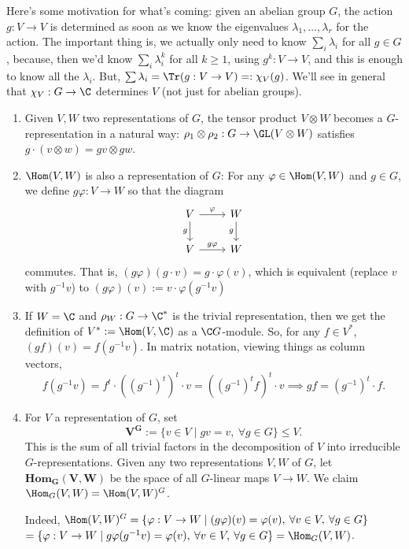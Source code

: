 Here's some motivation for what's coming: given an abelian group $G$, the action $g:V \to V$ is determined as soon as we know the eigenvalues $\lambda_1,\dots,\lambda_r$ for the action. The important thing is, we actually only need to know $\sum_{i}\lambda_i$ for all $g \in G$, because, then we'd know $\sum_{i}\lambda_i^k$ for all $k \geq 1$, using $g^k:V \to V$, and this is enough to know all the $\lambda_i$. But, $\sum \lambda_i = \Tr (g:V \to V)=: \chi_V(g)$. We'll see in general that $\chi _V:G \to \C$ determines $V$ (not just for abelian groups).

\begin{ex}
    \hfill
    \begin{enumerate}
        \item Given $V,W$ two representations of $G$, the tensor product $V \otimes W$ becomes a $G$-representation in a natural way: $\rho_1 \otimes \rho_2:G \to \GL(V\otimes W)$ satisfies $g \cdot (v \otimes w)=gv\otimes gw$.
        \item $\Hom(V,W)$ is also a representation of $G$: For any $\varphi \in \Hom(V,W)$ and $g \in G$, we define $g \varphi :V \to W$ so that the diagram
    \[\begin{tikzcd}[ampersand replacement=\&,sep=small]
    	V \&\& W \\
    	\\
    	V \&\& W
    	\arrow["\varphi", from=1-1, to=1-3]
    	\arrow["g"', from=1-1, to=3-1]
    	\arrow["g"', from=1-3, to=3-3]
    	\arrow["{g\varphi}", from=3-1, to=3-3]
    \end{tikzcd}\]
    commutes. That is, $(g\varphi)(g\cdot v)=g\cdot \varphi(v)$, which is equivalent (replace $v$ with $g^{-1}v$) to $(g \varphi )(v):= v\cdot \varphi (g^{-1}v)$
    \item If $W = \C$ and $\rho_W:G \to \C^*$ is the trivial representation, then we get the definition of $V^*:=\Hom(V,\C)$ as a $\C G$-module. So, for any $f \in V^*$, $(gf)(v)=f(g^{-1}v)$. In matrix notation, viewing things as column vectors,
    $$f(g^{-1}v)=f^t\cdot ((g^{-1})^t)^t\cdot v=((g^{-1})^tf)^t\cdot v\implies gf=(g^{-1})^t\cdot f.$$
    \item For $V$ a representation of $G$, set
    $$\bm{V^G}:= \{v\in V\mid gv=v,\: \forall g \in G\} \leq V.$$
    This is the sum of all trivial factors in the decomposition of $V$ into irreducible $G$-representations. Given any two representations $V,W$ of $G$, let $\textbf{Hom}_{\bm G}\bm{(V,W)}$ be the space of all $G$-linear maps $V \to W$. We claim $\Hom_G(V,W) = \Hom(V,W)^G$.
    
    Indeed, $\Hom(V,W)^G = \{ \varphi :V \to W \mid (g\varphi)(v)=\varphi (v),\: \forall v \in V, \: \forall g \in G \}$ $= \{ \varphi:V \to W \mid g\varphi (g^{-1}v)=\varphi (v),\: \forall v \in V,\: \forall g \in G\} = \Hom_G(V,W)$.
    \end{enumerate}
\end{ex}

